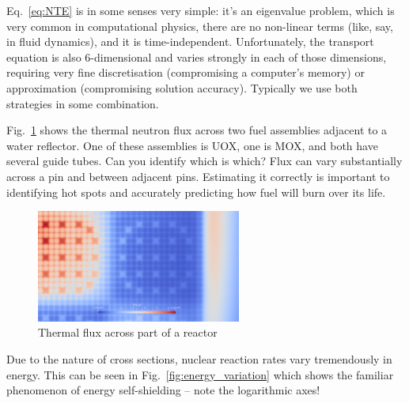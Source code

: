 \documentclass{article}
\begin{document}
Eq.~\eqref{eq:NTE} is in some senses very simple: it's an eigenvalue problem, which is very common in computational physics, there are no non-linear terms (like, say, in fluid dynamics), and it is time-independent. Unfortunately, the transport equation is also 6-dimensional and varies strongly in each of those dimensions, requiring very fine discretisation (compromising a computer's memory) or approximation (compromising solution accuracy). Typically we use both strategies in some combination.

Fig.~\ref{fig:thermal_flux} shows the thermal neutron flux across two fuel assemblies adjacent to a water reflector. One of these assemblies is UOX, one is MOX, and both have several guide tubes. Can you identify which is which? Flux can vary substantially across a pin and between adjacent pins. Estimating it correctly is important to identifying hot spots and accurately predicting how fuel will burn over its life. 

\begin{figure}[h]
        \centering
        \includegraphics[width=0.6\textwidth]{thermal_flux.png}
        \caption{Thermal flux across part of a reactor}
        \label{fig:thermal_flux}
\end{figure}

Due to the nature of cross sections, nuclear reaction rates vary tremendously in energy. This can be seen in Fig.~\ref{fig:energy_variation} which shows the familiar phenomenon of energy self-shielding -- note the logarithmic axes!
\end{document}
